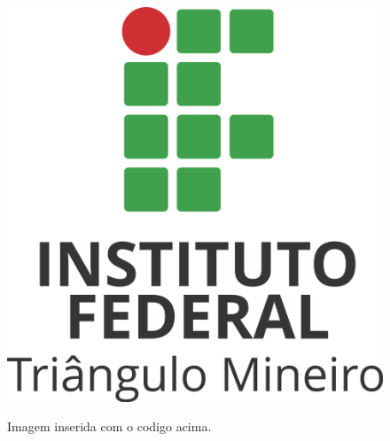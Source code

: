 \documentclass[a4paper]{article}
\begin{document}
\begin{figure}[h]
	\centering %
	\includegraphics[scale=0.4]{imagens/iftm.png}\\%
	\caption{Imagem inserida com o codigo acima.}%
\end{figure}
\end{document}
